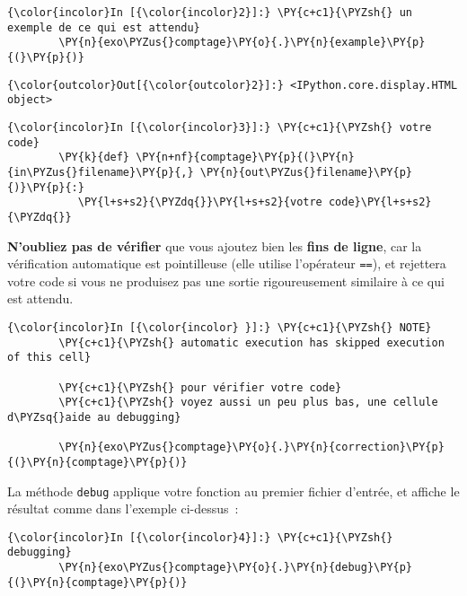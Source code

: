     \begin{Verbatim}[commandchars=\\\{\}]
{\color{incolor}In [{\color{incolor}2}]:} \PY{c+c1}{\PYZsh{} un exemple de ce qui est attendu}
        \PY{n}{exo\PYZus{}comptage}\PY{o}{.}\PY{n}{example}\PY{p}{(}\PY{p}{)}
\end{Verbatim}


\begin{Verbatim}[commandchars=\\\{\}]
{\color{outcolor}Out[{\color{outcolor}2}]:} <IPython.core.display.HTML object>
\end{Verbatim}
            
    \begin{Verbatim}[commandchars=\\\{\}]
{\color{incolor}In [{\color{incolor}3}]:} \PY{c+c1}{\PYZsh{} votre code}
        \PY{k}{def} \PY{n+nf}{comptage}\PY{p}{(}\PY{n}{in\PYZus{}filename}\PY{p}{,} \PY{n}{out\PYZus{}filename}\PY{p}{)}\PY{p}{:}
           \PY{l+s+s2}{\PYZdq{}}\PY{l+s+s2}{votre code}\PY{l+s+s2}{\PYZdq{}}
\end{Verbatim}


    \textbf{N'oubliez pas de vérifier} que vous ajoutez bien les
\textbf{fins de ligne}, car la vérification automatique est pointilleuse
(elle utilise l'opérateur \texttt{==}), et rejettera votre code si vous
ne produisez pas une sortie rigoureusement similaire à ce qui est
attendu.

    \begin{Verbatim}[commandchars=\\\{\}]
{\color{incolor}In [{\color{incolor} }]:} \PY{c+c1}{\PYZsh{} NOTE}
        \PY{c+c1}{\PYZsh{} automatic execution has skipped execution of this cell}
        
        \PY{c+c1}{\PYZsh{} pour vérifier votre code}
        \PY{c+c1}{\PYZsh{} voyez aussi un peu plus bas, une cellule d\PYZsq{}aide au debugging}
        
        \PY{n}{exo\PYZus{}comptage}\PY{o}{.}\PY{n}{correction}\PY{p}{(}\PY{n}{comptage}\PY{p}{)}
\end{Verbatim}


    La méthode \texttt{debug} applique votre fonction au premier fichier
d'entrée, et affiche le résultat comme dans l'exemple ci-dessus~:

    \begin{Verbatim}[commandchars=\\\{\}]
{\color{incolor}In [{\color{incolor}4}]:} \PY{c+c1}{\PYZsh{} debugging}
        \PY{n}{exo\PYZus{}comptage}\PY{o}{.}\PY{n}{debug}\PY{p}{(}\PY{n}{comptage}\PY{p}{)}
\end{Verbatim}


